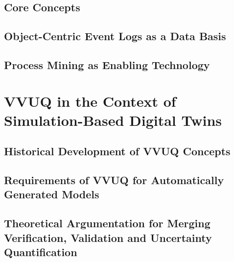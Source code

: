 \subsection{Core Concepts}

\subsection{Object-Centric Event Logs as a Data Basis}
\label{sec:object-centric-event-logs}


\subsection{Process Mining as Enabling Technology}



\section{VVUQ in the Context of Simulation-Based Digital Twins}
\label{sec:vvuq-sbdt}


\subsection{Historical Development of VVUQ Concepts}

\subsection{Requirements of VVUQ for Automatically Generated Models}

\subsection{Theoretical Argumentation for Merging Verification, Validation and Uncertainty Quantification}


